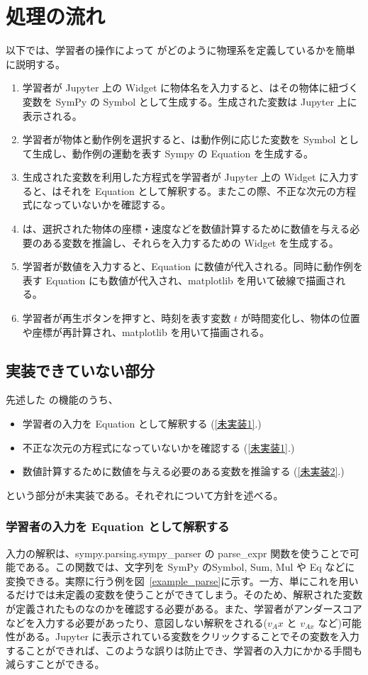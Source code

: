 \newpage
\section{処理の流れ}
以下では、学習者の操作によって \simname がどのように物理系を定義しているかを簡単に説明する。

\begin{enumerate}
  \item 学習者が Jupyter 上の Widget に物体名を入力すると、\simname はその物体に紐づく変数を SymPy の Symbol として生成する。生成された変数は Jupyter 上に表示される。
  \item 学習者が物体と動作例を選択すると、\simname は動作例に応じた変数を Symbol として生成し、動作例の運動を表す Sympy の Equation を生成する。
  \item 生成された変数を利用した方程式を学習者が Jupyter 上の Widget に入力すると、\simname はそれを Equation として解釈する。またこの際、不正な次元の方程式になっていないかを確認する。 \label{未実装1}
  \item \simname は、選択された物体の座標・速度などを数値計算するために数値を与える必要のある変数を推論し、それらを入力するための Widget を生成する。 \label{未実装2}
  \item 学習者が数値を入力すると、Equation に数値が代入される。同時に動作例を表す Equation にも数値が代入され、matplotlib を用いて破線で描画される。
  \item 学習者が再生ボタンを押すと、時刻を表す変数 $t$ が時間変化し、物体の位置や座標が再計算され、matplotlib を用いて描画される。
\end{enumerate}

\subsection{実装できていない部分}

先述した \simname の機能のうち、
\begin{itemize}
  \item 学習者の入力を Equation として解釈する (\ref{未実装1}.)
  \item 不正な次元の方程式になっていないかを確認する (\ref{未実装1}.)
  \item 数値計算するために数値を与える必要のある変数を推論する (\ref{未実装2}.)
\end{itemize}
という部分が未実装である。それぞれについて方針を述べる。

\subsubsection*{学習者の入力を Equation として解釈する}
入力の解釈は、sympy.parsing.sympy\_parser の parse\_expr 関数を使うことで可能である。この関数では、文字列を SymPy のSymbol, Sum, Mul や Eq などに変換できる。実際に行う例を図~\ref{example_parse}に示す。一方、単にこれを用いるだけでは未定義の変数を使うことができてしまう。そのため、解釈された変数が定義されたものなのかを確認する必要がある。また、学習者がアンダースコアなどを入力する必要があったり、意図しない解釈をされる($v_Ax$ と $v_{Ax}$ など)可能性がある。Jupyter に表示されている変数をクリックすることでその変数を入力することができれば、このような誤りは防止でき、学習者の入力にかかる手間も減らすことができる。

